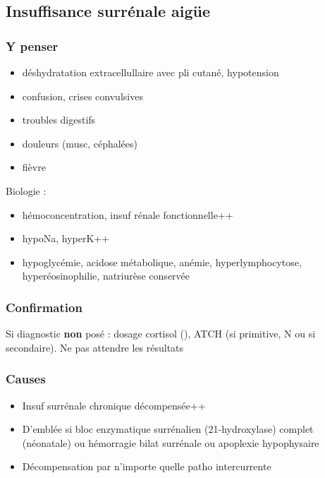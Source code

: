\documentclass[11pt]{article}
\begin{document}
\subsection{Insuffisance surrénale aigüe}
\label{sec:orgc3c8902}
\subsubsection{Y penser}
\label{sec:org2ffcda5}
\begin{itemize}
\item déshydratation extracellullaire avec pli cutané, hypotension
\item confusion, crises convulsives
\item troubles digestifs
\item douleurs (musc, céphalées)
\item fièvre
\end{itemize}
Biologie : 
\begin{itemize}
\item hémoconcentration, insuf rénale fonctionnelle++
\item hypoNa, hyperK++
\item hypoglycémie, acidose métabolique, anémie, hyperlymphocytose,
hyperéosinophilie, natriurèse conservée
\end{itemize}

\subsubsection{Confirmation}
\label{sec:orgbad2377}
Si diagnostic \textbf{non} posé : dosage cortisol (\dec\dec), ATCH (\inc si primitive, N ou \dec
si secondaire). 
Ne pas attendre les résultats \skull

\subsubsection{Causes}
\label{sec:orgf149725}
\begin{itemize}
\item Insuf surrénale chronique décompensée++
\item D'emblée si bloc enzymatique surrénalien (21-hydroxylase) complet (néonatale)
ou hémorragie bilat surrénale ou apoplexie hypophysaire
\item Décompensation par n'importe quelle patho intercurrente
\end{itemize}
\end{document}
